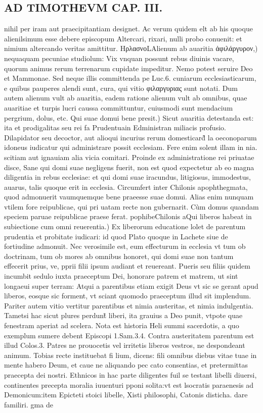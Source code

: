 \documentclass{article}
\begin{document}
\begin{pages}
\section*{AD TIMOTHEVM CAP. III. }
\marginpar{[ p.79 ]}\pstart nihil per iram aut praecipitantiam designet. Ac verum quidem elt ab his quoque alienilsimum esse debere episcopum Altercari, rixari, nulli probo conuenit: et nimium altercando veritas amittitur.  \pend\pstart HρλασνοLAlienum ab auaritia ἀφιλάργυρον,) nequaquam pecuniae studiolum: Vix vnquan possunt rebus diuinis vacare, quorum animus rerum terrenarum cupidate impeditur. Nemo potest seruire Deo et Mammonae. Sed neque illis committenda pe Luc.6. cuniarum ecclesiasticarum, e quibus pauperes alendi sunt, cura, qui vitio φιλαργυριας sunt notati. Dum autem alienum vult ab auaritia, eadem ratione alienum vult ab omnibus, quae auaritiae et turpis lucri caussa committuntur, cuiusmodi sunt mendacium pergrium, dolus, etc.  \pend\pstart Qui suae domui bene presit.) Sicut auaritia detestanda est: ita et prodigalitas seu rei fa Prudentuain Edministran miliacis profusio. Dilapidator seu decoctor, aut alioqui incurius rerum domesticard̃ la oeconoparum idoneus iudicatur qui administrare possit ecclesiam. Fere enim solent illam in nia. scitiam aut ignauiam alia vicia comitari. Proinde ex administratione rei priuatae disce, Sane qui domi suae negligens fuerit, non est quod expectetur ab eo magna diligentia in rebus ecclesiae: et qui domi suae iracundus, litigiosus, immodestus, auarus, talis quoque  erit in ecclesia. Circumfert inter Chilonis apophthegmata, quod admonuerit vaumquemque bene praeesse suae domui. Alias enim nunquam vtilem fore reipublicae, qui pri uatam recte non gubernarit. Cùm domus quandam speciem paruae reipublicae praese ferat. pophibeChilonis a\pend\pstart Qui liberos habeat in subiectione cum omni reuerentia.) Ex liberorum educatione lolet de parentum prudentia et probitate iudicari: id quod Plato quoque in Lachete siue de fortiudine admonuit. Nec verosimile est, eum effecturum in ecclesia vt tum ob doctrinam, tum ob mores ab omnibus honoret, qui domi suae non tantum effecerit prius, ve, pprii filii ipsum audiant et reuereant. Pueris seu filiis quidem incumbit sedulo iuxta praeceptum Dei, honorare patrem et matrem, ut sint longaeui super terram: Atqui a parentibus etiam exigit Deus vt sic se gerant apud liberos, eosque sic forment, vt sciant quomodo praeceptum illud sit implendum. Pariter autem vitio vertitur parentibus et nimia austeritas, et nimia indulgentia. Tametsi hac sicut plures perdunt̃ liberi, ita grauius a Deo punit, vtpote quae fenestram aperiat ad scelera. Nota est historia Heli summi sacerdotis, a quo exemplum sumere debent Episcopi 1.Sam.3.4. Contra austeritatem parentum est illud Colos.3. Patres ne prouocetis vel irritetis liberos vestros, ne despondeant animum. Tobias recte instituebat fi lium, dicens: fili omnibus diebus vitae tuae in mente habero Deum, et caue ne aliquando pec cato consentias, et pretermittas praecepta dei nostri. Ethnicos in hac parte diligentes fuil se testant libelli diuersi, continentes precepta moralia iuuenturi pponi solita:vt est lsocratis paraenesis ad Demonicum:item Epicteti stoici libelle, Xisti philosophi, Catonis disticha. dare familiri. gma de 
\end{pages}
\end{document}
